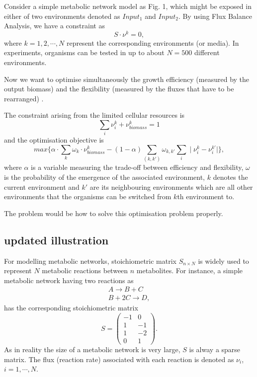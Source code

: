 \documentclass[paper=a4, fontsize=12pt]{scrartcl}	%
\numberwithin{equation}{section}					%
\numberwithin{figure}{section}					%
\numberwithin{table}{section}					%
\begin{document}
Consider a simple metabolic network model as Fig. 1, which might be exposed in either of two environments denoted as $Input_1$ and $Input_2$. By using Flux Balance Analysis, we have a constraint as 
\begin{equation}
\nonumber S\cdot \nu^k=0, 
\end{equation}
where $k=1,2, \cdots, N$ represent the corresponding environments (or media). In experiments, organisms can be tested in up to about $N=500$ different environments. 

Now we want to optimise simultaneously the growth efficiency (measured by the output biomass) and the flexibility (measured by the fluxes that have to be rearranged) . 

The constraint arising from the limited cellular resources is 
\begin{equation}
\nonumber \sum_i \nu_i^k + \nu_{biomass}^k=1
\end{equation}
and the optimisation objective is 
\begin{equation}
\nonumber max\{ \alpha \cdot \sum_k \omega_k\cdot \nu_{biomass}^k-(1-\alpha) \sum_{(k, k')}\omega_{k,k'} \sum_i \mid \nu_i^k-\nu_i^{k'} \mid \}, 
\end{equation}
where $\alpha$ is a variable measuring the trade-off between efficiency and flexibility, $\omega$ is the probability of the emergence of the associated environment, $k$ denotes the current environment and $k'$ are its neighbouring environments which are all other environments that the organisms can be switched from $k$th environment to. 

The problem would be how to solve this optimisation problem properly. 

\subsection{updated illustration}

For modelling metabolic networks, stoichiometric matrix $S_{n\times N}$ is widely used to represent $N$ metabolic reactions between $n$ metabolites. For instance, a simple metabolic network having two reactions as 
\begin{eqnarray}
\nonumber A\rightarrow B + C\\
\nonumber B+2C\rightarrow D,
\end{eqnarray}
has the corresponding stoichiometric matrix 
\begin{equation}
\nonumber S=\left(\begin{array}{cc}-1 & 0 \\1 & -1 \\1 & -2 \\0 & 1\end{array}\right). 
\end{equation}
As in reality the size of a metabolic network is very large, $S$ is alway a sparse matrix. The flux (reaction rate) associated with each reaction is denoted as $\nu_i$, $i=1,\cdots,N$.
\end{document}
